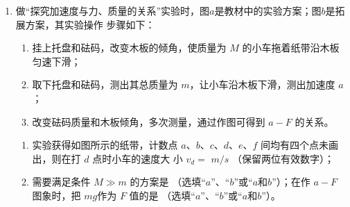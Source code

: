 \begin{enumerate}
\item
做“探究加速度与力、质量的关系”实验时，图$ a $是教材中的实验方案；图$ b $是拓展方案，其实验操作
步骤如下：
\begin{figure}[h!]
\centering
\begin{subfigure}{0.44\linewidth}
\centering
 
\caption{}\label{}
\end{subfigure}
\begin{subfigure}{0.44\linewidth}
\centering
 
\caption{}\label{}
\end{subfigure}
\end{figure}
\begin{enumerate}
\renewcommand{\labelenumii}{\roman{enumii}.}
\item
挂上托盘和砝码，改变木板的倾角，使质量为 $ M $ 的小车拖着纸带沿木板匀速下滑；
\item 
取下托盘和砝码，测出其总质量为 $ m $，让小车沿木板下滑，测出加速度 $ a $；
\item 
改变砝码质量和木板倾角，多次测量，通过作图可得到 $ a-F $ 的关系。


\end{enumerate}

\begin{enumerate}
\item
实验获得如图所示的纸带，计数点 $ a $、$ b $、$ c $、$ d $、$ e $、$ f $ 间均有四个点未画出，则在打 $ d $ 点时小车的速度大
小 $ v_d=$ \underlinegap $ m/s $ （保留两位有效数字）；
\begin{figure}[h!]
\centering

\end{figure}

\item 
需要满足条件 $ M \gg m $ 的方案是 \underlinegap （选填“$ a $”、“$ b $”或“$ a $和$ b $”）；在作 $ a-F $ 图象时，把 $ mg $作为 $ F $ 值的是 \underlinegap （选填“$ a $”、“$ b $”或“$ a $和$ b $”）。



\end{enumerate}






\end{enumerate}
